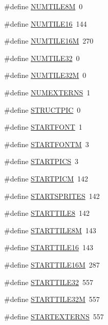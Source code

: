 \begin{DoxyCompactItemize}
\#define \hyperlink{GFXE__WL1_8H_a99d75e9d203bae79464f2ecd3fd31b8d}{NUMTILE8M}~0
\item 
\#define \hyperlink{GFXE__WL1_8H_a64d23288f15517babe845b31bebdf108}{NUMTILE16}~144
\item 
\#define \hyperlink{GFXE__WL1_8H_a80bd5aa78c52471ba88d9d15baeb5e44}{NUMTILE16M}~270
\item 
\#define \hyperlink{GFXE__WL1_8H_a63d2fe64d989433ecd39d601070bfe04}{NUMTILE32}~0
\item 
\#define \hyperlink{GFXE__WL1_8H_ac85fdf79a513ee60e10cbb347ba5129f}{NUMTILE32M}~0
\item 
\#define \hyperlink{GFXE__WL1_8H_abb86554baf24d8863e54bf20d68120b5}{NUMEXTERNS}~1
\item 
\#define \hyperlink{GFXE__WL1_8H_aa325a0ff072fddd0404951d4f486fcaa}{STRUCTPIC}~0
\item 
\#define \hyperlink{GFXE__WL1_8H_a91e546d8307de206a3822f7ea9064cb2}{STARTFONT}~1
\item 
\#define \hyperlink{GFXE__WL1_8H_a8e97342cc14d7aed1d20b6ff859f22ef}{STARTFONTM}~3
\item 
\#define \hyperlink{GFXE__WL1_8H_aaf17bc60cff0a0236cafed9026641531}{STARTPICS}~3
\item 
\#define \hyperlink{GFXE__WL1_8H_abd418cd2e72de01524b8400b58ad8273}{STARTPICM}~142
\item 
\#define \hyperlink{GFXE__WL1_8H_a08f15ca2b66024c7df43a601df18e33a}{STARTSPRITES}~142
\item 
\#define \hyperlink{GFXE__WL1_8H_a63a36c8955b74ee16ba0fc61f4d62478}{STARTTILE8}~142
\item 
\#define \hyperlink{GFXE__WL1_8H_a56df7bfae7e081f1fe22c67f356c0f12}{STARTTILE8M}~143
\item 
\#define \hyperlink{GFXE__WL1_8H_adde5c841b7c315dca1c114be851a14bf}{STARTTILE16}~143
\item 
\#define \hyperlink{GFXE__WL1_8H_a8158cbe2ebd8e9f311fd7637be063176}{STARTTILE16M}~287
\item 
\#define \hyperlink{GFXE__WL1_8H_afdb080cedc6a487f761df7481033e345}{STARTTILE32}~557
\item 
\#define \hyperlink{GFXE__WL1_8H_a04e773bd033b5375cb82a2bc5142eb3a}{STARTTILE32M}~557
\item 
\#define \hyperlink{GFXE__WL1_8H_a4bab9c7dbc3408ece8bf42a298f4a0ad}{STARTEXTERNS}~557
\end{DoxyCompactItemize}
